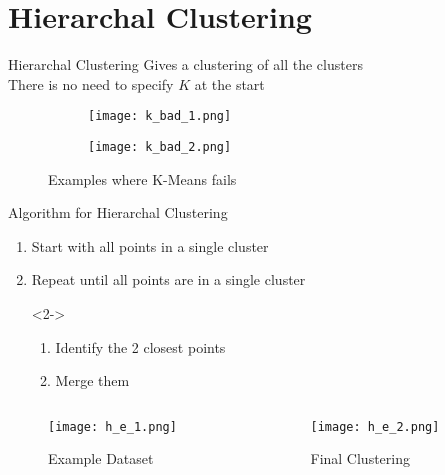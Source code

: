 \documentclass{beamer}
\begin{document}
\section{Hierarchal Clustering}

\begin{frame}{Hierarchal Clustering}
\vspace{1cm}
Gives a clustering of all the clusters \\
\pause
There is no need to specify $K$ at the start
\pause
\vspace{-0.5cm}
\begin{figure}
        \begin{subfigure}[b]{0.5\textwidth}
                \texttt{[image: k\_bad\_1.png]}
        \end{subfigure}%
        \begin{subfigure}[b]{0.5\textwidth}
                \texttt{[image: k\_bad\_2.png]}
        \end{subfigure}%
        \caption{Examples where K-Means fails}
\end{figure}
\end{frame}

\begin{frame}{Algorithm for Hierarchal Clustering}
\vspace{0.5cm}
\begin{enumerate}
\item<1-> Start with all points in a single cluster
\item<4-> Repeat until all points are in a single cluster
\item[]<2-> \begin{enumerate}
\item<2-> Identify the 2 closest points 
\item<3-> Merge them
\end{enumerate}
\end{enumerate}
\vspace{-0.8cm}
\begin{columns}[T]
  \begin{column}{0.5\textwidth}
    \begin{figure}
      \texttt{[image: h\_e\_1.png]}
      \vspace*{-0.6cm}
      \caption{Example Dataset}
    \end{figure}
  \end{column}
  \begin{column}{0.5\textwidth}
    \begin{figure}
    \begin{overprint}
       \texttt{[image: h\_e\_2.png]}
      \vspace*{-0.6cm}
      \caption{Final Clustering}
    \end{overprint}
    \end{figure}
  \end{column}
\end{columns}
\end{frame}
\end{document}
